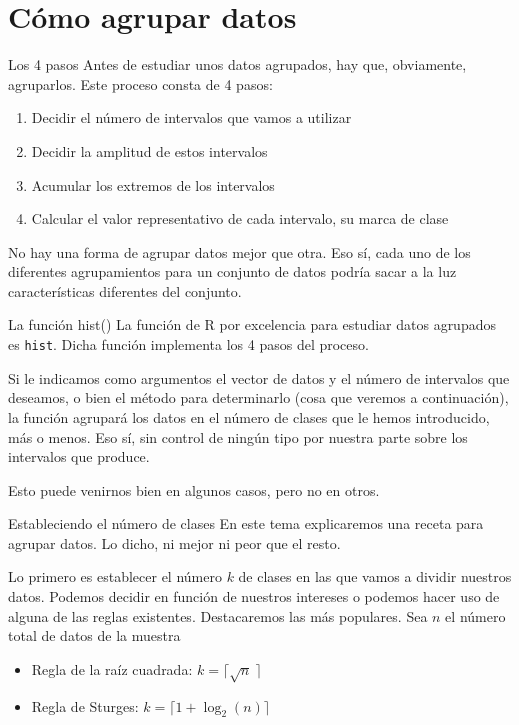 \documentclass[
  ignorenonframetext,
]{beamer}
\providecommand{\tightlist}{%
  \setlength{\itemsep}{0pt}\setlength{\parskip}{0pt}}
\begin{document}
\hypertarget{cuxf3mo-agrupar-datos}{%
\section{Cómo agrupar datos}\label{cuxf3mo-agrupar-datos}}

\begin{frame}{Los 4 pasos}
\protect\hypertarget{los-4-pasos}{}
Antes de estudiar unos datos agrupados, hay que, obviamente, agruparlos.
Este proceso consta de 4 pasos:

\begin{enumerate}
\tightlist
\item
  Decidir el número de intervalos que vamos a utilizar
\item
  Decidir la amplitud de estos intervalos
\item
  Acumular los extremos de los intervalos
\item
  Calcular el valor representativo de cada intervalo, su marca de clase
\end{enumerate}

No hay una forma de agrupar datos mejor que otra. Eso sí, cada uno de
los diferentes agrupamientos para un conjunto de datos podría sacar a la
luz características diferentes del conjunto.
\end{frame}

\begin{frame}[fragile]{La función hist()}
\protect\hypertarget{la-funciuxf3n-hist}{}
La función de R por excelencia para estudiar datos agrupados es
\texttt{hist}. Dicha función implementa los 4 pasos del proceso.

Si le indicamos como argumentos el vector de datos y el número de
intervalos que deseamos, o bien el método para determinarlo (cosa que
veremos a continuación), la función agrupará los datos en el número de
clases que le hemos introducido, más o menos. Eso sí, sin control de
ningún tipo por nuestra parte sobre los intervalos que produce.

Esto puede venirnos bien en algunos casos, pero no en otros.
\end{frame}

\begin{frame}{Estableciendo el número de clases}
\protect\hypertarget{estableciendo-el-nuxfamero-de-clases}{}
En este tema explicaremos una receta para agrupar datos. Lo dicho, ni
mejor ni peor que el resto.

Lo primero es establecer el número \(k\) de clases en las que vamos a
dividir nuestros datos. Podemos decidir en función de nuestros intereses
o podemos hacer uso de alguna de las reglas existentes. Destacaremos las
más populares. Sea \(n\) el número total de datos de la muestra

\begin{itemize}
\tightlist
\item
  Regla de la raíz cuadrada: \(k = \lceil\sqrt{n}\ \rceil\)
\item
  Regla de Sturges: \(k = \lceil 1+\log_{2}(n)\rceil\)
\end{itemize}
\end{frame}
\end{document}
